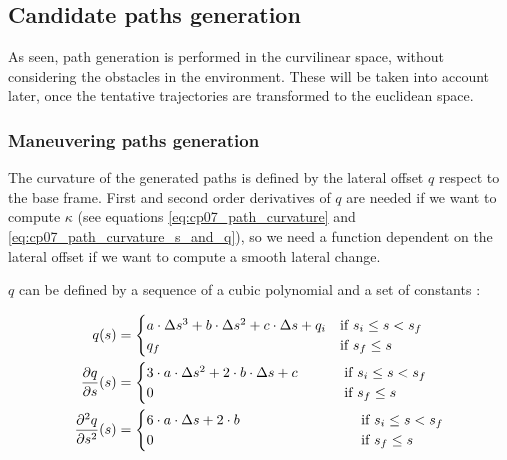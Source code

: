 \subsection{Candidate paths generation}\label{ch:chapter07_01_03}

As seen, path generation is performed in the curvilinear space, without considering the obstacles in the environment. These will be taken into account later, once the tentative trajectories are transformed to the euclidean space.

\subsubsection{Maneuvering paths generation}\label{ch:chapter07_01_03_01}

The curvature of the generated paths is defined by the lateral offset $q$ respect to the base frame. First and second order derivatives of $q$ are needed if we want to compute $\kappa$ (see equations \ref{eq:cp07_path_curvature} and \ref{eq:cp07_path_curvature_s_and_q}), so we need a function dependent on the lateral offset if we want to compute a smooth lateral change.

$q$ can be defined by a sequence of a cubic polynomial and a set of constants \citep{chu2012local}:

\begin{equation}\label{eq:cp07_function_q}
\begin{align*}
q(s) &=
  \begin{cases}
   a \cdot \Delta s^3 + b \cdot \Delta s^2 + c \cdot \Delta s + q_i & \text{if } s_i \le s < s_f \\
   q_f        & \text{if } s_f \le s
  \end{cases}\\
{{\partial q} \over {\partial s}}(s) &=
  \begin{cases}
   3 \cdot a \cdot \Delta s^2 + 2 \cdot b \cdot \Delta s + c & ~~~~~~~\text{if } s_i \le s < s_f \\
   0        & ~~~~~~~\text{if } s_f \le s
  \end{cases}\\
{{\partial^2 q} \over {\partial s^2}}(s) &=
  \begin{cases}
   6 \cdot a \cdot \Delta s + 2 \cdot b & ~~~~~~~~~~~~~~~~~~~~~~~\text{if } s_i \le s < s_f \\
   0        & ~~~~~~~~~~~~~~~~~~~~~~~\text{if } s_f \le s
  \end{cases}
\end{align*}
\end{equation}

